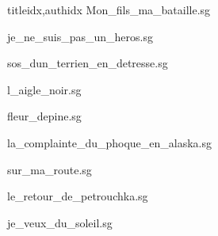 \documentclass[
    ]{article}
\begin{document}
\begin{songs}{titleidx,authidx}
{Mon_fils_ma_bataille.sg}


{je_ne_suis_pas_un_heros.sg}


{sos_dun_terrien_en_detresse.sg}


{l_aigle_noir.sg}


{fleur_depine.sg}


{la_complainte_du_phoque_en_alaska.sg}


{sur_ma_route.sg}


{le_retour_de_petrouchka.sg}


{je_veux_du_soleil.sg}


\end{songs}
\end{document}
